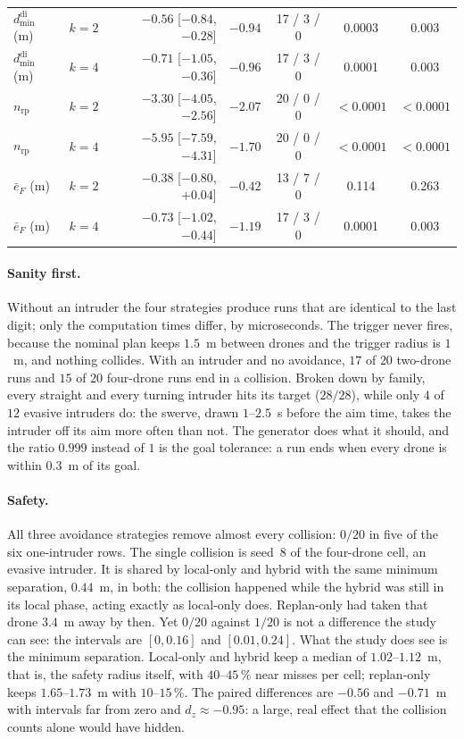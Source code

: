\begin{table}[tb]
\begin{tabular}{@{}llrcccc@{}}
  $d_{\min}^{\mathrm{di}}$ (m) & $k{=}2$ & $-0.56$ [$-0.84$, $-0.28$] & $-0.94$ & 17 / 3 / 0 & 0.0003 & 0.003\\
  $d_{\min}^{\mathrm{di}}$ (m) & $k{=}4$ & $-0.71$ [$-1.05$, $-0.36$] & $-0.96$ & 17 / 3 / 0 & 0.0001 & 0.003\\
  $n_{\mathrm{rp}}$ & $k{=}2$ & $-3.30$ [$-4.05$, $-2.56$] & $-2.07$ & 20 / 0 / 0 & $<0.0001$ & $<0.0001$\\
  $n_{\mathrm{rp}}$ & $k{=}4$ & $-5.95$ [$-7.59$, $-4.31$] & $-1.70$ & 20 / 0 / 0 & $<0.0001$ & $<0.0001$\\
  $\bar e_F$ (m) & $k{=}2$ & $-0.38$ [$-0.80$, $+0.04$] & $-0.42$ & 13 / 7 / 0 & 0.114 & 0.263\\
  $\bar e_F$ (m) & $k{=}4$ & $-0.73$ [$-1.02$, $-0.44$] & $-1.19$ & 17 / 3 / 0 & 0.0001 & 0.003\\
  \bottomrule
  \end{tabular}
\end{table}

\paragraph{Sanity first.}
Without an intruder the four strategies produce runs that are identical to
the last digit; only the computation times differ, by microseconds. The
trigger never fires, because the nominal plan keeps $1.5$~m between drones
and the trigger radius is $1$~m, and nothing collides. With an intruder and
no avoidance, $17$ of $20$ two-drone runs and $15$ of $20$ four-drone runs
end in a collision. Broken down by family, every straight and every turning
intruder hits its target ($28/28$), while only $4$ of $12$ evasive intruders
do: the swerve, drawn $1$--$2.5$~s before the aim time, takes the intruder
off its aim more often than not. The generator does what it should, and the
ratio $0.999$ instead of $1$ is the goal tolerance: a run ends when every
drone is within $0.3$~m of its goal.

\paragraph{Safety.}
All three avoidance strategies remove almost every collision: $0/20$ in
five of the six one-intruder rows. The single collision is seed~$8$ of the
four-drone cell, an evasive intruder. It is shared by local-only and
hybrid with the same minimum separation, $0.44$~m, in both: the collision
happened while the hybrid was still in its local phase, acting exactly as
local-only does. Replan-only had taken that drone $3.4$~m away by then. Yet
$0/20$ against $1/20$ is not a difference the study can see: the intervals
are $[0, 0.16]$ and $[0.01, 0.24]$. What the study does see is the minimum
separation. Local-only and hybrid keep a median of $1.02$--$1.12$~m, that is,
the safety radius itself, with $40$--$45\,\%$ near misses per cell;
replan-only keeps $1.65$--$1.73$~m with $10$--$15\,\%$. The paired
differences are $-0.56$ and $-0.71$~m with intervals far from zero and
$d_z \approx -0.95$: a large, real effect that the collision counts alone
would have hidden.

